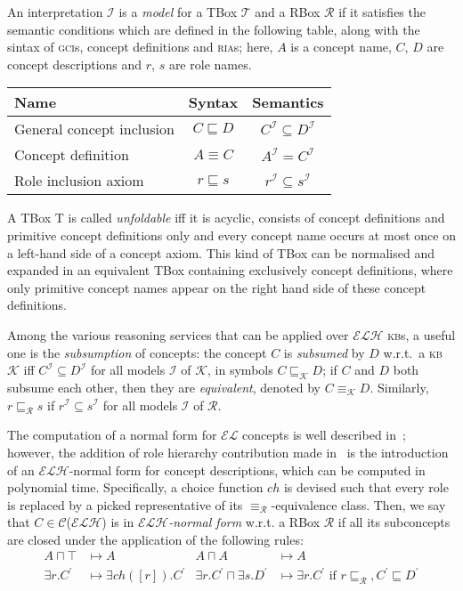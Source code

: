\documentclass[]{llncs}
\newcommand{\el}{\(\mathcal{EL}{}\)}
\newcommand{\elh}{\(\mathcal{ELH}{}\)}
\newcommand{\kb}{\textsc{kb}}
\newcommand{\ria}{\textsc{ria}}
\newcommand{\gci}{\textsc{gci}}
\newcommand{\subsume}[1]{\sqsubseteq_{\mathcal{#1}}}
\begin{document}
  An interpretation \(\mathcal{I}\) is a \emph{model} for a TBox \(\mathcal{T}\) and a RBox \(\mathcal{R}\) if it satisfies the semantic conditions which are defined in the following table, along with the sintax of \gci{}s, concept definitions and \ria{}s; here, \(A\) is a concept name, \(C\), \(D\) are concept descriptions and \(r\), \(s\) are role names.
  \begin{center}
    \begin{tabular}{lcc}
      \toprule
      Name & Syntax & Semantics \\
      \midrule
      General concept inclusion & \(C \sqsubseteq D\) & \(C^\mathcal{I} \subseteq D^\mathcal{I}\) \\
      Concept definition & \(A \equiv C\) & \(A^\mathcal{I} = C^\mathcal{I}\) \\
      Role inclusion axiom & \(r \sqsubseteq s\) & \(r^\mathcal{I} \subseteq s^\mathcal{I}\) \\
      \bottomrule
    \end{tabular}
  \end{center}
  A TBox T is called \emph{unfoldable} iff it is acyclic, consists of concept definitions and primitive concept definitions only and every concept name occurs at most once on a left-hand side of a concept axiom.
  This kind of TBox can be normalised and expanded in an equivalent TBox containing exclusively concept definitions, where only primitive concept names appear on the right hand side of these concept definitions.

  Among the various reasoning services that can be applied over \elh{} \kb{}s, a useful one is the \emph{subsumption} of concepts: the concept \(C\) is \emph{subsumed} by \(D\) w.r.t.\ a \kb{} \(\mathcal{K}\) iff \(C^\mathcal{I} \subseteq D^\mathcal{I}\) for all models \(\mathcal{I}\) of \(\mathcal{K}\), in symbols \(C \subsume{K} D\);
  if \(C\) and \(D\) both subsume each other, then they are \emph{equivalent}, denoted by \(C \equiv_{\mathcal{K}} D\).
  Similarly, \(r \subsume{R} s\) if \(r^\mathcal{I} \subseteq s^\mathcal{I}\) for all models \(\mathcal{I}\) of \(\mathcal{R}\).

  The computation of a normal form for \el{} concepts is well described in~\cite{DLbook}; however, the addition of role hierarchy contribution made in~\cite{LeTu12} is the introduction of an \elh-normal form for concept descriptions, which can be computed in polynomial time.
  Specifically, a choice function \(ch{}\) is devised such that every role is replaced by a picked representative of its \(\equiv_\mathcal{R}\)-equivalence class.
  Then, we say that \(C \in \mathcal{C}\)(\elh) is in \emph{\elh-normal form} w.r.t. a RBox \(\mathcal{R}\) if all its subconcepts are closed under the application of the following rules:
  \begin{align*}
    A \sqcap \top &\mapsto A & A \sqcap A &\mapsto A \tag{1--2}\\
    \exists{}r.C^\prime &\mapsto \exists{}ch([r]).C^\prime &
    \exists{}r.C^\prime \sqcap \exists{}s.D^\prime &\mapsto
    \exists{}r.C^\prime\,\,\text{if}\,\,r\subsume{R}, C^\prime \sqsubseteq D^\prime \tag{3--4}
  \end{align*}
\end{document}
